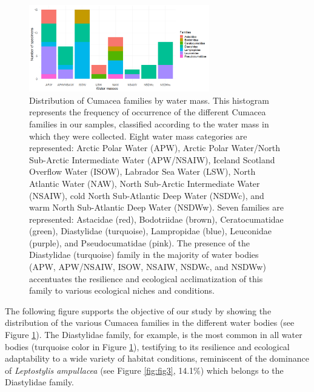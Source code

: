 {\begin{figure}[htbp]
    \centering
    \includegraphics[width=0.7\textwidth]{figure3.png}
    \caption{Distribution of Cumacea families by water mass. This histogram represents the frequency of occurrence of the different Cumacea families in our samples, classified according to the water mass in which they were collected. Eight water mass categories are represented: Arctic Polar Water (APW), Arctic Polar Water/North Sub-Arctic Intermediate Water (APW/NSAIW), Iceland Scotland Overflow Water (ISOW), Labrador Sea Water (LSW), North Atlantic Water (NAW), North Sub-Arctic Intermediate Water (NSAIW), cold North Sub-Atlantic Deep Water (NSDWc), and warm North Sub-Atlantic Deep Water (NSDWw). Seven families are represented: Astacidae (red), Bodotriidae (brown), Ceratocumatidae (green), Diastylidae (turquoise), Lampropidae (blue), Leuconidae (purple), and Pseudocumatidae (pink). The presence of the Diastylidae (turquoise) family in the majority of water bodies (APW, APW/NSAIW, ISOW, NSAIW, NSDWc, and NSDWw) accentuates the resilience and ecological acclimatization of this family to various ecological niches and conditions. \label{fig:fig4}}
\end{figure}

The following figure supports the objective of our study by showing the distribution of the various Cumacea families in the different water bodies (see Figure \ref{fig:fig4}). The Diastylidae family, for example, is the most common in all water bodies (turquoise color in Figure \ref{fig:fig4}), testifying to its resilience and ecological adaptability to a wide variety of habitat conditions, reminiscent of the dominance of \emph{Leptostylis ampullacea} (see Figure \ref{fig:fig3}, 14.1\%) which belongs to the Diastylidae family. 

}
